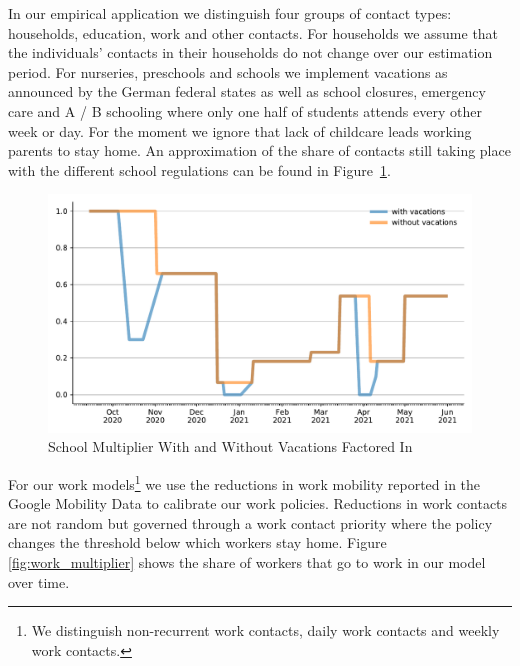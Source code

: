 \FloatBarrier

In our empirical application we distinguish four groups of contact types: households,
education, work and other contacts.
For households we assume that the individuals'
contacts in their households do not change over our estimation period.
For nurseries, preschools and schools we implement vacations as announced by the German
federal states as well as school closures, emergency care and A / B schooling where only
one half of students attends every other week or day. For the moment we ignore that lack
of childcare leads working parents to stay home. An approximation of the share of contacts still taking place with the different school regulations can be found in Figure~\ref{fig:school_multiplier}.

\begin{figure}
    \centering
    \includegraphics[width=\textwidth]{../figures/results/figures/data/school_multiplier_comparison}
    \caption{School Multiplier With and Without Vacations Factored In}
    \floatfoot{\noindent}
    \label{fig:school_multiplier}
\end{figure}


%
%
%
%

For our work models\footnote{We distinguish non-recurrent work contacts, daily work
contacts and weekly work contacts.} we use the reductions in work mobility reported in
the Google Mobility Data \citep{Google2021} to calibrate our work policies. Reductions in
work contacts are not random but governed through a work contact priority where the
policy changes the threshold below which workers stay home. Figure
\ref{fig:work_multiplier} shows the share of workers that go to work in our model over
time.

